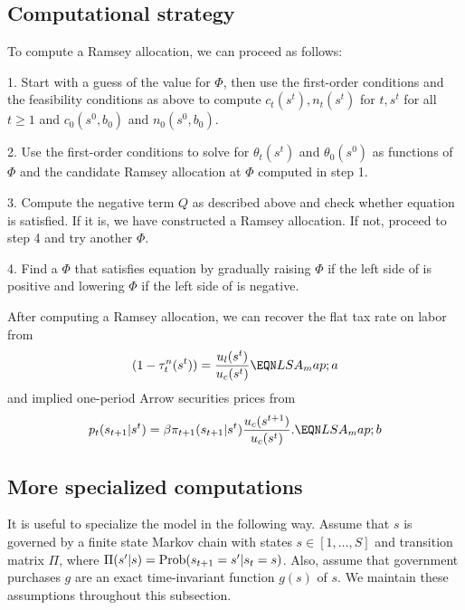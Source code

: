 \subsection{Computational  strategy}

To
compute a Ramsey allocation, we can proceed as follows:

\medskip

\item{1.} Start with a guess of the value for $\Phi$,  then use the first-order conditions    and the
feasibility conditions 
as above to compute $c_t(s^t), n_t(s^t)$ for $t, s^t$ for all $t \geq 1$ and
$c_0(s^0,b_0)$ and $n_0(s^0, b_0)$.

\medskip
\item{2.} Use the first-order conditions  to solve for $\theta_t(s^t)$
and $\theta_0(s^0)$ as functions of $\Phi$ and  the candidate Ramsey allocation at $\Phi$ computed in step 1.

\medskip

\item{3.}  Compute the negative term $Q$ as described above and check
whether equation  is satisfied.  If it is, we have constructed
a Ramsey allocation. If not, proceed to step 4 and try another $\Phi$.

\medskip

\item{4.}  Find a $\Phi$ that satisfies equation  by gradually raising $\Phi$ if the
left side of  is positive and lowering $\Phi$ if the left side of 
is negative.

\medskip

\noindent After computing a Ramsey allocation, we can recover the flat tax rate on labor from
$$ (1 - \tau_t^n(s^t)) = {\frac{u_l(s^t)}{u_c(s^t)} }  \EQN LSA_map;a $$
and  implied one-period Arrow securities prices from
$$ p_{t}(s_{t+1}| s^t) = \beta \pi_{t+1}(s_{t+1} | s^t) {\frac{u_c(s^{t+1})}{u_c({s^t})}} .\EQN LSA_map;b $$






\subsection{More specialized computations}
It is useful to specialize the model in the following way.
Assume that  $s$ is governed by a finite state Markov chain with
states $s\in [1, \ldots, S]$ and  transition matrix $\Pi$, where $\Pi(s'|s) = {\rm Prob}(s_{t+1} = s'| s_t =s)$. Also,
assume that government purchases $g$ are an exact time-invariant function  $g(s)$ of
$s$. We maintain these assumptions throughout this subsection.


